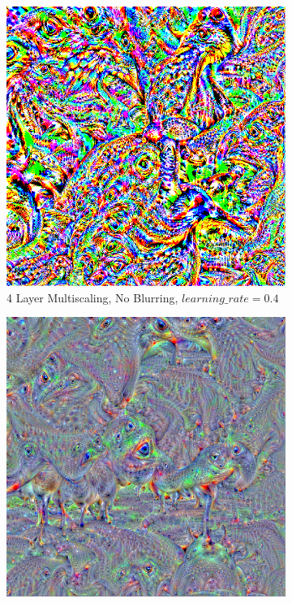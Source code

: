 \begin{figure}
    \captionsetup{justification=centering}

    \begin{subfigure}[t]{0.31\textwidth}
        \captionsetup{justification=centering}
        \centering
        \includegraphics[width=.7\linewidth]{figuras/feat_vis/experiments/layers/final/l12/random_image_pl4_lr4e-1_layer26_no-blur.png}
        \caption{4 Layer Multiscaling, No Blurring, \(learning\_rate = 0.4\)}
    \end{subfigure}
    \hfill
    \begin{subfigure}[t]{0.31\textwidth}
        \captionsetup{justification=centering}
        \centering
        \includegraphics[width=.7\linewidth]{figuras/feat_vis/experiments/layers/final/l12/random_image_pl4_lr4e-2_layer26_no-blur.png}

\end{subfigure}
\end{figure}
